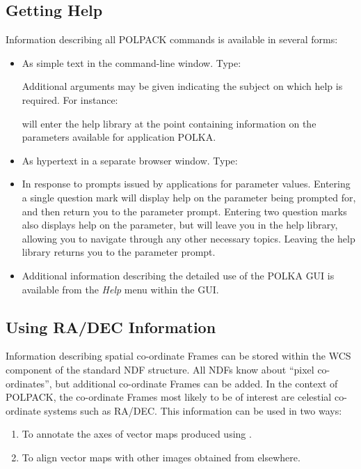 \documentclass[twoside,11pt]{starlink}
\begin{document}
\subsection{Getting Help}
Information describing all POLPACK commands is available in several forms:
\begin{itemize}
\item As simple text in the command-line window. Type:

\begin{terminalv}
\end{terminalv}

Additional arguments may be given indicating the subject on which help is
required. For instance:

\begin{terminalv}
\end{terminalv}

will enter the help library at the point containing information on the
parameters available for application POLKA.

\item As hypertext in a separate browser window. Type:

\begin{terminalv}
\end{terminalv}

\item In response to prompts issued by applications for parameter values.
Entering a single question mark will display help on the parameter being
prompted for, and then return you to the parameter prompt. Entering two
question marks also displays help on the parameter, but will leave you in the
help library, allowing you to navigate through any other necessary
topics. Leaving the help library returns you to the parameter prompt.

\item Additional information describing the detailed use of the POLKA
GUI is available from the \emph{Help} menu within the GUI.

\end{itemize}

\subsection{\label{SEC:WCS}Using RA/DEC Information}
Information describing spatial co-ordinate Frames can be stored within the
WCS component of the standard NDF structure. All NDFs know about ``pixel
co-ordinates'', but additional co-ordinate Frames can be added. In the context
of POLPACK, the co-ordinate Frames most likely to be of interest are celestial
co-ordinate systems such as RA/DEC. This information can be used in two
ways:
\begin{enumerate}
\item To annotate the axes of vector maps produced using .
\item To align vector maps with other images obtained from elsewhere.
\end{enumerate}
\end{document}
